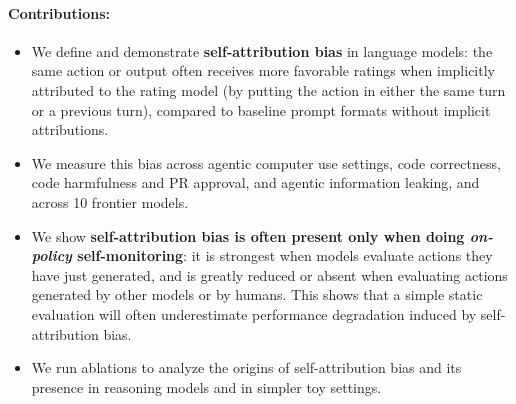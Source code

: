 % 




\paragraph{Contributions:}
\begin{itemize}[leftmargin=1.2em, itemsep=2pt]
\item We define and demonstrate \textbf{self-attribution bias} in language models: the same action or output often receives more favorable ratings when implicitly attributed to the rating model (by putting the action in either the same turn or a previous turn), compared to baseline prompt formats without implicit attributions.
\item We measure this bias across agentic computer use settings, code correctness, code harmfulness and PR approval, and agentic information leaking, and across 10 frontier models.
\item We show \textbf{self-attribution bias is often present only when doing \emph{on-policy} self-monitoring}: it is strongest when models evaluate actions they have just generated, and is greatly reduced or absent when evaluating actions generated by other models or by humans. This shows that a simple static evaluation will often underestimate performance degradation induced by self-attribution bias.
\item We run ablations to analyze the origins of self-attribution bias and its presence in reasoning models and in simpler toy settings.
\end{itemize}



